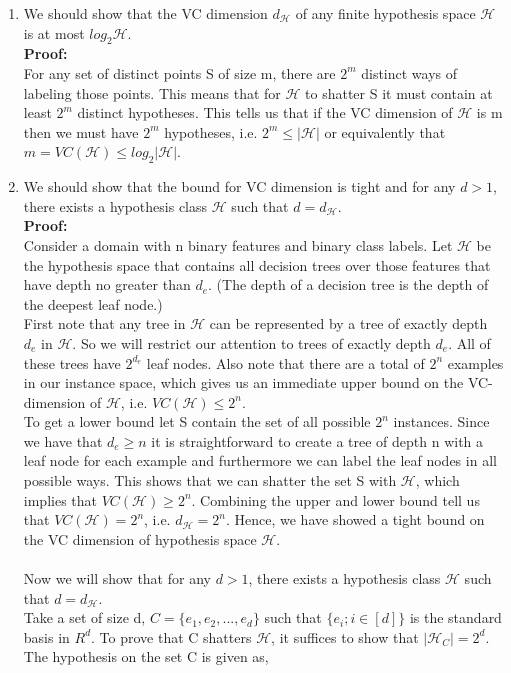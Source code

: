 \documentclass{article}
\begin{document}
\begin{enumerate}
    \item We should show that the VC dimension $d_\mathcal{H}$ of any finite hypothesis space $\mathcal{H}$ is at most $log_{2}\mathcal{H}$.
\\\textbf{Proof:}
\\For any set of distinct points S of size m, there are $2^m$ distinct ways of labeling those points. This means that for $\mathcal{H}$ to shatter S it must contain at least $2^m$ distinct hypotheses. This tells us that if the VC dimension of $\mathcal{H}$ is m then we must have $2^m$ hypotheses, i.e. $2^m \leq |\mathcal{H}| $ or equivalently that $m = VC(\mathcal{H}) \leq log_{2}|\mathcal{H}|$.
    \item We should show that the bound for VC dimension is tight and for any $d > 1$, there exists a hypothesis class $\mathcal{H}$ such that $d = d_\mathcal{H}$.
\\\textbf{Proof:}
\\Consider a domain with n binary features and binary class labels. Let $\mathcal{H}$ be the hypothesis space that contains all decision trees over those features that have depth no greater than $d_e$. (The depth of a decision tree is the depth of the deepest leaf node.)
\\First note that any tree in $\mathcal{H}$ can be represented by a tree of exactly depth $d_e$ in $\mathcal{H}$. So we will restrict our attention to trees of exactly depth $d_e$. All of these trees have $2^{d_e}$ leaf nodes. Also note that there are a total of $2^n$ examples in our instance space, which gives us an immediate upper bound on the VC-dimension of $\mathcal{H}$, i.e. $VC(\mathcal{H}) \leq 2^n$.
\\To get a lower bound let S contain the set of all possible $2^n$
instances. Since we have that $d_e \geq n$ it is straightforward to create a tree of depth n with a leaf node for each example and furthermore we can label the leaf nodes in all possible ways. This shows that we can shatter the set S with $\mathcal{H}$, which implies that $VC(\mathcal{H}) \geq 2^n$. Combining the upper and lower bound tell us that $VC(\mathcal{H}) = 2^n$, i.e. $d_\mathcal{H} = 2^n$.
Hence, we have showed a tight bound on the VC dimension of hypothesis space $\mathcal{H}$.
\\\\Now we will show that for any $d > 1$, there exists a hypothesis class $\mathcal{H}$ such that $d = d_\mathcal{H}$.
\\Take a set of size d, $C = \{e_1, e_2, . . . , e_d\}$ such that $\{e_i;i \in [d]\}$ is the standard basis in $R^d$. To prove that C shatters $\mathcal{H}$, it suffices to show that $|\mathcal{H}_C| = 2^d$. The hypothesis on the set C is given as,

\end{enumerate}
\end{document}
